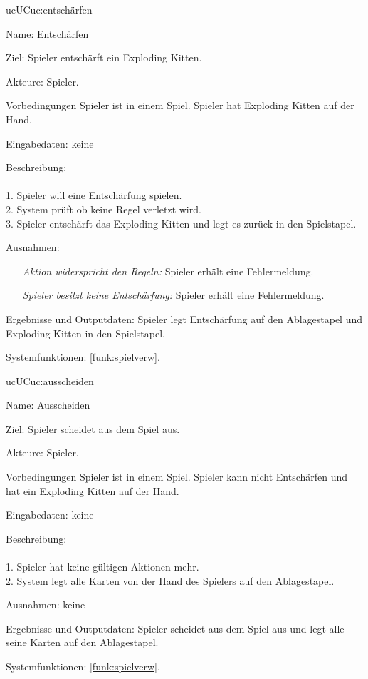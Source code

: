 \begin{description}[leftmargin=5em, style=sameline]
	\begin{lhp}{uc}{UC}{uc:entschärfen}
    	\item [Name:] Entschärfen
    	\item [Ziel:] Spieler entschärft ein Exploding Kitten.
    	\item [Akteure:] Spieler.
    	\item [Vorbedingungen] Spieler ist in einem Spiel. Spieler hat Exploding Kitten auf der Hand.
      	\item [Eingabedaten:] keine
    	\item [Beschreibung:] \hfill\\ \hfill\\
    	1. Spieler will eine Entschärfung spielen.\\
    	2. System prüft ob keine Regel verletzt wird.\\
    	3. Spieler entschärft das Exploding Kitten und legt es zurück in den Spielstapel.\\
    	\item [Ausnahmen:] \hfill
    	\begin{itemize} 
				\item[] \textit{Aktion widerspricht den Regeln:} Spieler erhält eine Fehlermeldung.
				\item[] \textit{Spieler besitzt keine Entschärfung:} Spieler erhält eine Fehlermeldung.
			\end{itemize} 
    	\item [Ergebnisse und Outputdaten:] Spieler legt Entschärfung auf den Ablagestapel und Exploding Kitten in den Spielstapel.
    	\item [Systemfunktionen:] \ref{funk:spielverw}.
    \end{lhp}
    
    \begin{lhp}{uc}{UC}{uc:ausscheiden}
    	\item [Name:] Ausscheiden
    	\item [Ziel:] Spieler scheidet aus dem Spiel aus.
    	\item [Akteure:] Spieler.
    	\item [Vorbedingungen] Spieler ist in einem Spiel. Spieler kann nicht Entschärfen und hat ein Exploding Kitten auf der Hand.
      	\item [Eingabedaten:] keine
    	\item [Beschreibung:] \hfill\\ \hfill\\
    	1. Spieler hat keine gültigen Aktionen mehr.\\
    	2. System legt alle Karten von der Hand des Spielers auf den Ablagestapel.\\
    	\item [Ausnahmen:] keine
    	\item [Ergebnisse und Outputdaten:] Spieler scheidet aus dem Spiel aus und legt alle seine Karten auf den Ablagestapel.
    	\item [Systemfunktionen:] \ref{funk:spielverw}.
    \end{lhp}


\end{description}
